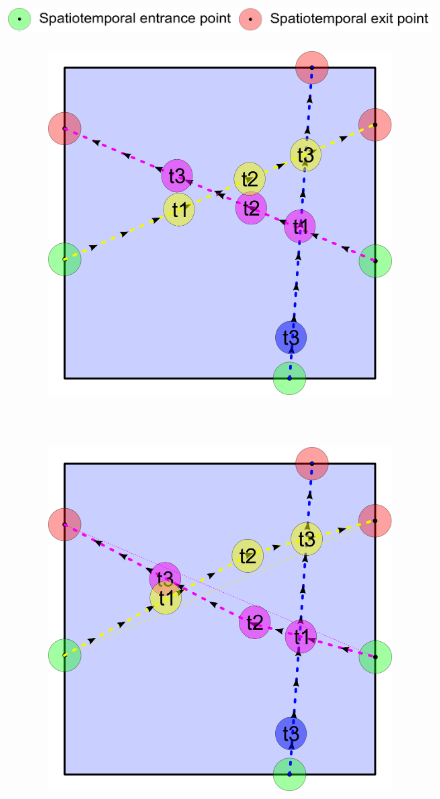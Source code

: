 \begin{figure}[t]
	\centering
	\includegraphics[width=0.5\linewidth]{./images/key-entry-exit-point-hor.png}
	\\	
	\begin{subfigure}[b]{0.27\linewidth}
		\includegraphics[width=\linewidth]{./images/collision-2D-example-with-collision.png}
		\caption{}
	\end{subfigure}
	~~~~~%
	\begin{subfigure}[b]{0.27\linewidth}
		\includegraphics[width=\linewidth]{./images/collision-2D-example-without-collision.png}

\end{subfigure}
\end{figure}
